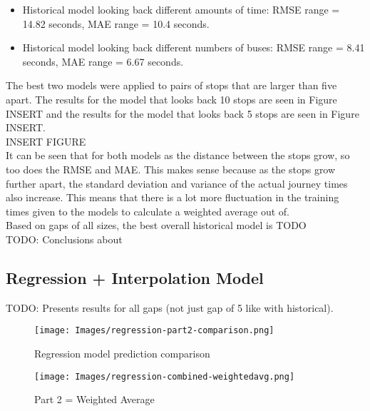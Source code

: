 \begin{itemize}
    \item Historical model looking back different amounts of time: RMSE range = 14.82 seconds, MAE range = 10.4 seconds.
    \item Historical model looking back different numbers of buses: RMSE range = 8.41 seconds, MAE range = 6.67 seconds.
\end{itemize}

The best two models were applied to pairs of stops that are larger than five apart. The results for the model that looks back 10 stops are seen in Figure INSERT and the results for the model that looks back 5 stops are seen in Figure INSERT. \\

INSERT FIGURE \\

It can be seen that for both models as the distance between the stops grow, so too does the RMSE and MAE. This makes sense because as the stops grow further apart, the standard deviation and variance of the actual journey times also increase. This means that there is a lot more fluctuation in the training times given to the models to calculate a weighted average out of. \\

Based on gaps of all sizes, the best overall historical model is TODO \\ 

TODO: Conclusions about 

\subsection{Regression + Interpolation Model}

TODO: Presents results for all gaps (not just gap of 5 like with historical). 

\begin{figure}[H]
\begin{center}
    \texttt{[image: Images/regression-part2-comparison.png]}
    \caption{Regression model prediction comparison}
    \label{fig:regression-comparison}
\end{center}
\end{figure}

\begin{figure}[H]
\begin{center}
    \texttt{[image: Images/regression-combined-weightedavg.png]}
    \caption{Part 2 = Weighted Average}
    \label{fig:regression-part2weightedavg}
\end{center}
\end{figure}

